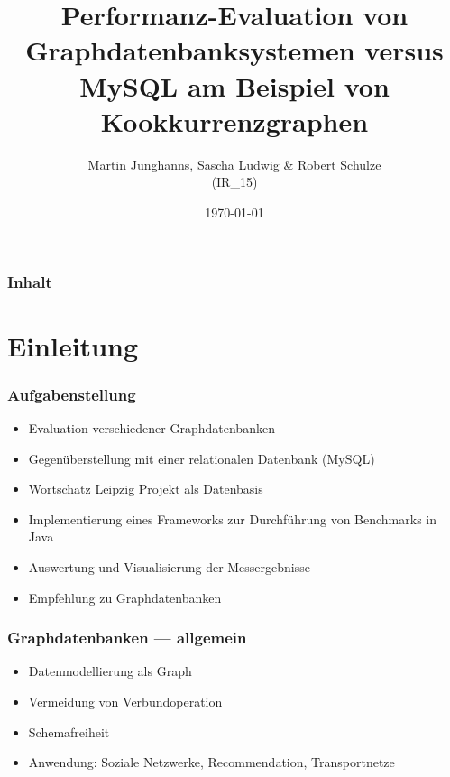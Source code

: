 \documentclass{beamer}
\begin{document}
\title{Performanz-Evaluation von Graphdatenbanksystemen versus MySQL am Beispiel von Kookkurrenzgraphen}
\author{Martin Junghanns, Sascha Ludwig \& Robert Schulze\\(IR\_{}15)} 
\date{\today}

\begin{frame}
	\titlepage
\end{frame}

\begin{frame}\frametitle{Inhalt}
	\tableofcontents
\end{frame}

\section{Einleitung}

\begin{frame}\frametitle{Aufgabenstellung}
	\begin{itemize}
		\item Evaluation verschiedener Graphdatenbanken
		\item Gegenüberstellung mit einer relationalen Datenbank (MySQL)
		\item Wortschatz Leipzig Projekt als Datenbasis
		\item Implementierung eines Frameworks zur Durchführung von Benchmarks in Java
		\item Auswertung und Visualisierung der Messergebnisse
		\item Empfehlung zu Graphdatenbanken
	\end{itemize} 
\end{frame}

\begin{frame}\frametitle{Graphdatenbanken --- allgemein}
	\begin{itemize}
		\item Datenmodellierung als Graph
		\item Vermeidung von Verbundoperation
		\item Schemafreiheit
		\item Anwendung: Soziale Netzwerke, Recommendation, Transportnetze
	\end{itemize} 
\end{frame}
\end{document}
